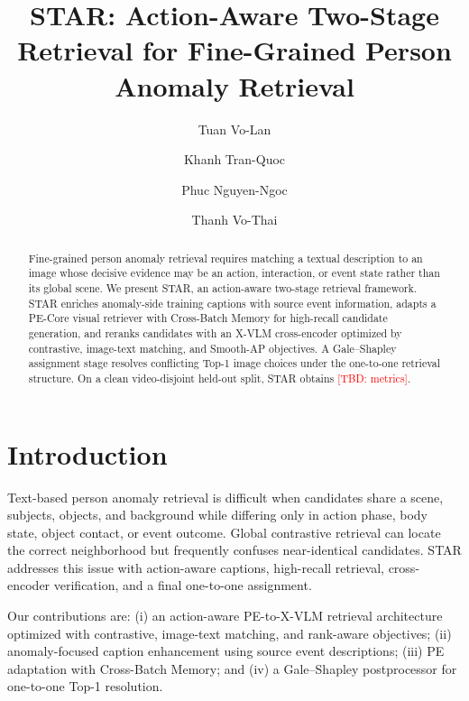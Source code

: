 \documentclass[runningheads]{llncs}
\newcommand{\todo}[1]{\textcolor{red}{[TBD: #1]}}
\begin{document}
\title{STAR: Action-Aware Two-Stage Retrieval for Fine-Grained Person Anomaly Retrieval}

\author{Tuan Vo-Lan \and Khanh Tran-Quoc \and Phuc Nguyen-Ngoc \and Thanh Vo-Thai}

\maketitle

\begin{abstract}
Fine-grained person anomaly retrieval requires matching a textual description to an image whose
decisive evidence may be an action, interaction, or event state rather than its global scene.
We present STAR, an action-aware two-stage retrieval framework. STAR enriches anomaly-side
training captions with source event information, adapts a PE-Core visual retriever with
Cross-Batch Memory for high-recall candidate generation, and reranks candidates with an X-VLM
cross-encoder optimized by contrastive, image-text matching, and Smooth-AP objectives.
A Gale--Shapley assignment stage resolves conflicting Top-1 image choices under the one-to-one
retrieval structure. On a clean video-disjoint held-out split, STAR obtains \todo{metrics}.
\end{abstract}

\section{Introduction}
Text-based person anomaly retrieval is difficult when candidates share a scene, subjects,
objects, and background while differing only in action phase, body state, object contact, or
event outcome. Global contrastive retrieval can locate the correct neighborhood but frequently
confuses near-identical candidates. STAR addresses this issue with action-aware captions,
high-recall retrieval, cross-encoder verification, and a final one-to-one assignment.

Our contributions are: (i) an action-aware PE-to-X-VLM retrieval architecture optimized with
contrastive, image-text matching, and rank-aware objectives; (ii) anomaly-focused caption
enhancement using source event descriptions; (iii) PE adaptation with Cross-Batch Memory; and
(iv) a Gale--Shapley postprocessor for one-to-one Top-1 resolution.
\end{document}
